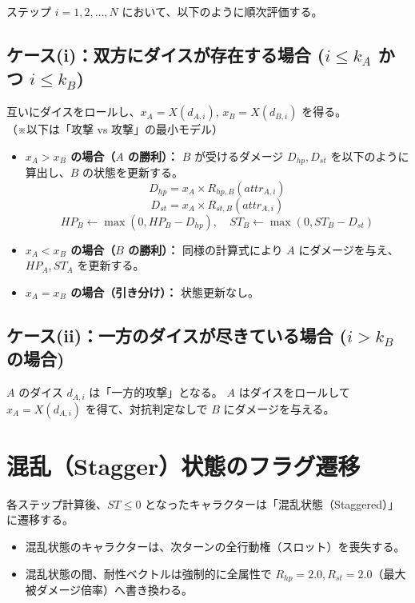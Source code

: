 \documentclass{article}
\begin{document}
ステップ $i = 1, 2, \dots, N$ において、以下のように順次評価する。

\subsection{ケース(i)：双方にダイスが存在する場合 ($i \le k_A$ かつ $i \le k_B$)}
互いにダイスをロールし、$x_A = X(d_{A, i})$, $x_B = X(d_{B, i})$ を得る。\\
（※以下は「攻撃 vs 攻撃」の最小モデル）

\begin{itemize}
    \item \textbf{$x_A > x_B$ の場合（$A$ の勝利）：}
    $B$ が受けるダメージ $D_{hp}, D_{st}$ を以下のように算出し、$B$ の状態を更新する。
    \[
    D_{hp} = x_A \times R_{hp, B}(attr_{A, i})
    \]
    \[
    D_{st} = x_A \times R_{st, B}(attr_{A, i})
    \]
    \[
    HP_B \leftarrow \max(0, HP_B - D_{hp}), \quad ST_B \leftarrow \max(0, ST_B - D_{st})
    \]

    \item \textbf{$x_A < x_B$ の場合（$B$ の勝利）：}
    同様の計算式により $A$ にダメージを与え、$HP_A, ST_A$ を更新する。

    \item \textbf{$x_A = x_B$ の場合（引き分け）：}
    状態更新なし。
\end{itemize}

\subsection{ケース(ii)：一方のダイスが尽きている場合 ($i > k_B$ の場合)}
$A$ のダイス $d_{A, i}$ は「一方的攻撃」となる。
$A$ はダイスをロールして $x_A = X(d_{A, i})$ を得て、対抗判定なしで $B$ にダメージを与える。

\section{混乱（Stagger）状態のフラグ遷移}
各ステップ計算後、$ST \le 0$ となったキャラクターは「混乱状態（Staggered）」に遷移する。
\begin{itemize}
    \item 混乱状態のキャラクターは、次ターンの全行動権（スロット）を喪失する。
    \item 混乱状態の間、耐性ベクトルは強制的に全属性で $R_{hp} = 2.0, R_{st} = 2.0$（最大被ダメージ倍率）へ書き換わる。
\end{itemize}
\end{document}
